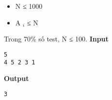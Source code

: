 \begin{itemize}
	\item N ≤ 1000
	\item A $_ i $ ≤ N
\end{itemize}

Trong 70\% số test, N ≤ 100.
\textbf{Input }
\begin{verbatim}
5
4 5 2 3 1\end{verbatim}

\textbf{Output }
\begin{verbatim}
3\end{verbatim}